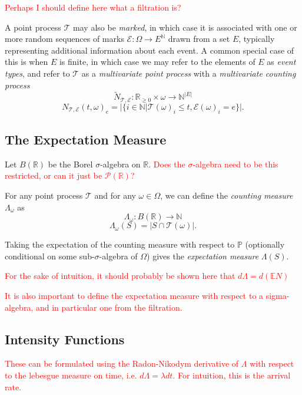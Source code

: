 \documentclass[honours,12pt]{unswthesis}
\numberwithin{equation}{section}
\begin{document}
\textcolor{red}{Perhaps I should define here what a filtration is?}

{\noindent}A point process $\mathcal T$ may also be \textit{marked}, in which case it is associated with one or more random sequences of marks $\mathcal E:\Omega\to E^{\mathbb N}$ drawn from a set $E$, typically representing additional information about each event. A common special case of this is when $E$ is finite, in which case we may refer to the elements of $E$ as \textit{event types}, and refer to $\mathcal T$ as a \textit{multivariate point process} with a \textit{multivariate counting process}
$${\tilde N}_{\mathcal T, \mathcal E} : \mathbb{R}_{\geq 0}\times\omega \to \mathbb N ^ {\vert E \vert}$$
$$N_{\mathcal T, \mathcal E}(t,\omega)_e = \vert \{i\in\mathbb N \vert \mathcal{T}(\omega)_i \leq t, \mathcal{E}(\omega)_i=e\} \vert.$$

\subsection{The Expectation Measure}
Let $B(\mathbb{R})$ be the Borel $\sigma$-algebra on $\mathbb R$.
\textcolor{red}{Does the $\sigma$-algebra need to be this restricted, or can it just be $\mathcal{P}(\mathbb{R})$?}

{\noindent}For any point process $\mathcal T$ and for any $\omega\in\Omega$, we can define the \textit{counting measure} $\Lambda_\omega$ as
$$\Lambda_\omega : B(\mathbb R) \to \mathbb{N}$$
$$\Lambda_\omega(S) = \left\vert S\cap \mathcal{T}(\omega)\right\vert.$$

Taking the expectation of the counting measure with respect to $\mathbb{P}$ (optionally conditional on some sub-$\sigma$-algebra of $\Omega$) gives the \textit{expectation measure} $\Lambda(S)$.

\textcolor{red}{For the sake of intuition, it should probably be shown here that $d\Lambda=d(\mathbb{E}N)$}

\textcolor{red}{It is also important to define the expectation measure with respect to a sigma-algebra, and in particular one from the filtration.}

\subsection{Intensity Functions}
\textcolor{red}{These can be formulated using the Radon-Nikodym derivative of $\Lambda$ with respect to the lebesgue measure on time, i.e. $d\Lambda=\lambda dt$.}
\textcolor{red}{For intuition, this is the arrival rate.}
\end{document}

